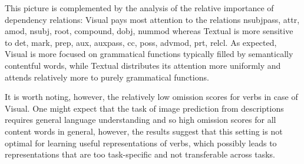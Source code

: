 This picture is complemented by the analysis of the
relative importance of dependency relations: {\sc Visual} pays most
attention to the relations {\sc nsubjpass, attr, amod, nsubj, root,
  compound, dobj, nummod}
whereas {\sc Textual} is more sensitive to {\sc det, mark, prep, aux,
  auxpass, cc, poss, advmod, prt, relcl}.
As expected, {\sc Visual} is more focused on grammatical
functions typically filled by semantically contentful words, while
{\sc Textual} distributes its attention more uniformly and 
attends relatively more to purely grammatical functions. 

It is worth noting, however, the relatively low omission scores for verbs in case \label{edit:generality}
of {\sc Visual}. One might expect that the task of image prediction from
descriptions requires general language understanding and so high omission
scores for all content words in general, however, the results
suggest that this setting is not optimal for learning useful representations of verbs,
which possibly leads to representations that are too task-specific 
and not transferable across tasks. 

